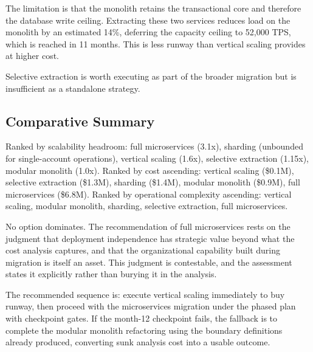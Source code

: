 The limitation is that the monolith retains the transactional core and therefore the database write ceiling. Extracting these two services reduces load on the monolith by an estimated 14\%, deferring the capacity ceiling to 52,000 TPS, which is reached in 11 months. This is less runway than vertical scaling provides at higher cost.

Selective extraction is worth executing as part of the broader migration but is insufficient as a standalone strategy.

\subsection{Comparative Summary}

Ranked by scalability headroom: full microservices (3.1x), sharding (unbounded for single-account operations), vertical scaling (1.6x), selective extraction (1.15x), modular monolith (1.0x). Ranked by cost ascending: vertical scaling (\$0.1M), selective extraction (\$1.3M), sharding (\$1.4M), modular monolith (\$0.9M), full microservices (\$6.8M). Ranked by operational complexity ascending: vertical scaling, modular monolith, sharding, selective extraction, full microservices.

No option dominates. The recommendation of full microservices rests on the judgment that deployment independence has strategic value beyond what the cost analysis captures, and that the organizational capability built during migration is itself an asset. This judgment is contestable, and the assessment states it explicitly rather than burying it in the analysis.

The recommended sequence is: execute vertical scaling immediately to buy runway, then proceed with the microservices migration under the phased plan with checkpoint gates. If the month-12 checkpoint fails, the fallback is to complete the modular monolith refactoring using the boundary definitions already produced, converting sunk analysis cost into a usable outcome.
